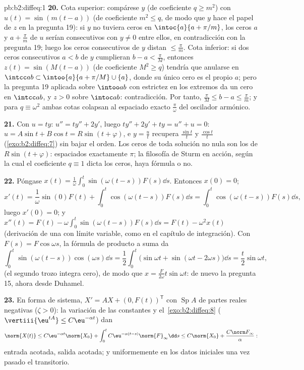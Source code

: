 \begin{solution}{pb:b2:diffeq:1}
\textbf{20.} Cota superior: compárese $y$ (de coeficiente $q \geq
m^2$) con $u(t) = \sin(m(t - a))$ (de coeficiente $m^2 \leq q$, de
modo que $y$ hace el papel de $z$ en la pregunta 19): si $y$ no
tuviera ceros en $\intoc{a}{a + \pi/m}$, los ceros $a$ y $a +
\frac\pi m$ de $u$ serían consecutivos con $y \neq 0$ entre ellos, en
contradicción con la pregunta 19; luego los ceros consecutivos de $y$
distan $\leq \frac\pi m$. Cota inferior: si dos ceros consecutivos $a
< b$ de $y$ cumplieran $b - a < \frac\pi M$, entonces $z(t) =
\sin(M(t-a))$ (de coeficiente $M^2 \geq q$) tendría que anularse en
$\intcc ab \subset \intoo{a}{a + \pi/M} \cup\{a\}$, donde su único
cero es el propio $a$; pero la pregunta 19 aplicada sobre $\intoo
ab$ con estrictez en los extremos da un cero en $\intcc ab$, y $z >
0$ sobre $\intoc ab$: contradicción. Por tanto, $\frac\pi M \leq b -
a \leq \frac\pi m$; y para $q \equiv \omega^2$ ambas cotas colapsan
al espaciado exacto $\frac\pi\omega$ del oscilador armónico.

\textbf{21.} Con $u = ty$: $u'' = ty'' + 2y'$, luego $ty'' + 2y' + ty
= u'' + u = 0$: $u = A\sin t + B\cos t = R\sin(t + \varphi)$, e $y =
\frac{u}{t}$ recupera $\frac{\sin t}t$ y $\frac{\cos t}t$
(\cref{exo:b2:diffeq:7}) sin bajar el orden. Los ceros de toda
solución no nula son los de $R\sin(t + \varphi)$: espaciados
exactamente $\pi$; la filosofía de Sturm en acción, según la cual el
coeficiente $q \equiv 1$ dicta los ceros, haya fórmula o no.

\textbf{22.} Póngase $x(t) =
\frac1\omega\int_0^t\sin(\omega(t-s))F(s)\dd s$. Entonces $x(0) = 0$;
\[
x'(t) = \frac1\omega\sin(0)F(t) +
\int_0^t\cos(\omega(t-s))F(s)\dd s
= \int_0^t\cos(\omega(t-s))F(s)\dd s ,
\]
luego $x'(0) = 0$; y $x''(t) = F(t) -
\omega\int_0^t\sin(\omega(t-s))F(s)\dd s = F(t) - \omega^2x(t)$
(derivación de una  con límite variable, como
en el capítulo de integración). Con $F(s) = F\cos\omega s$, la
fórmula de producto a suma da
\[
\int_0^t\sin(\omega(t-s))\cos(\omega s)\dd s
= \frac12\int_0^t\bigl(\sin\omega t + \sin(\omega t -
2\omega s)\bigr)\dd s
= \frac{t}{2}\sin\omega t ,
\]
(el segundo trozo integra cero), de modo que $x =
\frac{F}{2\omega}t\sin\omega t$: de nuevo la pregunta 15, ahora desde
Duhamel.

\textbf{23.} En forma de sistema, $X' = AX + (0, F(t))^{\mathsf T}$
con $\operatorname{Sp}A$ de partes reales negativas ($\zeta > 0$): la
variación de las constantes y el~\cref{exo:b2:diffeq:8}
($\vertiii{\eu^{tA}} \leq C\eu^{-\alpha t}$) dan
\[
\norm{X(t)} \leq C\eu^{-\alpha t}\norm{X_0}
+ \int_0^t C\eu^{-\alpha(t-s)}\norm{F}_\infty\dd s
\leq C\norm{X_0} + \frac{C\norm F_\infty}{\alpha} :
\]
entrada acotada, salida acotada; y uniformemente en los datos
iniciales una vez pasado el transitorio.


\end{solution}
